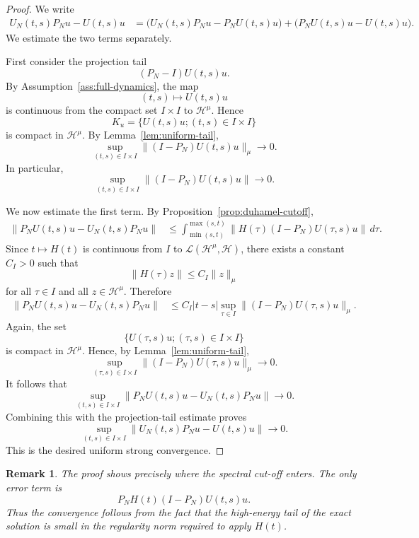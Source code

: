 \documentclass[10pt,a4paper]{amsart}
\newtheorem{remark}[theorem]{Remark}
\newcommand{\Hilb}{\mathcal H}
\begin{document}
\begin{proof}
We write
\[
\begin{aligned}
        U_N(t,s)P_Nu-U(t,s)u
        &=
        \bigl(U_N(t,s)P_Nu-P_NU(t,s)u\bigr)
        +
        \bigl(P_NU(t,s)u-U(t,s)u\bigr).
\end{aligned}
\]
We estimate the two terms separately.

First consider the projection tail
\[
        (P_N-I)U(t,s)u.
\]
By Assumption~\ref{ass:full-dynamics}, the map
\[
        (t,s)\longmapsto U(t,s)u
\]
is continuous from the compact set \(I\times I\) to \(\Hilb^\mu\).
Hence
\[
        K_u=\{U(t,s)u;(t,s)\in I\times I\}
\]
is compact in \(\Hilb^\mu\).  By Lemma~\ref{lem:uniform-tail},
\[
        \sup_{(t,s)\in I\times I}
        \|(I-P_N)U(t,s)u\|_\mu
        \longrightarrow0.
\]
In particular,
\[
        \sup_{(t,s)\in I\times I}
        \|(I-P_N)U(t,s)u\|
        \longrightarrow0.
\]

We now estimate the first term.  By
Proposition~\ref{prop:duhamel-cutoff},
\[
\begin{aligned}
        \|P_NU(t,s)u-U_N(t,s)P_Nu\|
        &\leq
        \int_{\min(s,t)}^{\max(s,t)}
        \|H(\tau)(I-P_N)U(\tau,s)u\|
        \,d\tau .
\end{aligned}
\]
Since \(t\mapsto H(t)\) is continuous from \(I\) to
\(\mathcal L(\Hilb^\mu,\Hilb)\), there exists a constant \(C_I>0\) such
that
\[
        \|H(\tau)z\|
        \leq C_I\|z\|_\mu
\]
for all \(\tau\in I\) and all \(z\in\Hilb^\mu\).  Therefore
\[
\begin{aligned}
        \|P_NU(t,s)u-U_N(t,s)P_Nu\|
        &\leq
        C_I |t-s|
        \sup_{\tau\in I}
        \|(I-P_N)U(\tau,s)u\|_\mu .
\end{aligned}
\]
Again, the set
\[
        \{U(\tau,s)u;(\tau,s)\in I\times I\}
\]
is compact in \(\Hilb^\mu\).  Hence, by
Lemma~\ref{lem:uniform-tail},
\[
        \sup_{(\tau,s)\in I\times I}
        \|(I-P_N)U(\tau,s)u\|_\mu
        \longrightarrow0.
\]
It follows that
\[
        \sup_{(t,s)\in I\times I}
        \|P_NU(t,s)u-U_N(t,s)P_Nu\|
        \longrightarrow0.
\]
Combining this with the projection-tail estimate proves
\[
        \sup_{(t,s)\in I\times I}
        \|U_N(t,s)P_Nu-U(t,s)u\|
        \longrightarrow0.
\]
This is the desired uniform strong convergence.
\end{proof}

\begin{remark}
The proof shows precisely where the spectral cut-off enters.  The only
error term is
\[
        P_NH(t)(I-P_N)U(t,s)u.
\]
Thus the convergence follows from the fact that the high-energy tail of
the exact solution is small in the regularity norm required to apply
\(H(t)\).
\end{remark}
\end{document}
